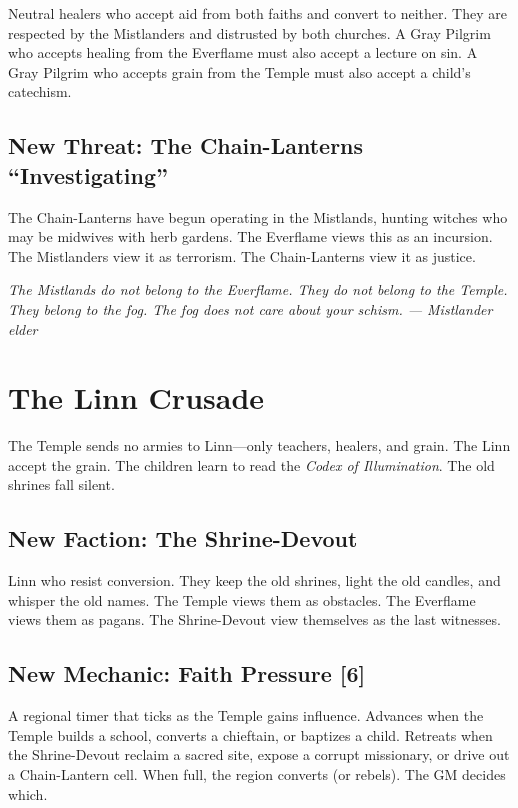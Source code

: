 \documentclass{book}
\newcommand{\citation}[1]{\textcolor{marginalia}{\small\textit{#1}}}
\begin{document}
Neutral healers who accept aid from both faiths and convert to neither. They are respected by the Mistlanders and distrusted by both churches. A Gray Pilgrim who accepts healing from the Everflame must also accept a lecture on sin. A Gray Pilgrim who accepts grain from the Temple must also accept a child's catechism.

\section{New Threat: The Chain-Lanterns ``Investigating''}

The Chain-Lanterns have begun operating in the Mistlands, hunting witches who may be midwives with herb gardens. The Everflame views this as an incursion. The Mistlanders view it as terrorism. The Chain-Lanterns view it as justice.

\citation{The Mistlands do not belong to the Everflame. They do not belong to the Temple. They belong to the fog. The fog does not care about your schism. --- Mistlander elder}

\chapter{The Linn Crusade}

The Temple sends no armies to Linn---only teachers, healers, and grain. The Linn accept the grain. The children learn to read the \textit{Codex of Illumination}. The old shrines fall silent.

\section{New Faction: The Shrine-Devout}

Linn who resist conversion. They keep the old shrines, light the old candles, and whisper the old names. The Temple views them as obstacles. The Everflame views them as pagans. The Shrine-Devout view themselves as the last witnesses.

\section{New Mechanic: Faith Pressure [6]}

A regional timer that ticks as the Temple gains influence. Advances when the Temple builds a school, converts a chieftain, or baptizes a child. Retreats when the Shrine-Devout reclaim a sacred site, expose a corrupt missionary, or drive out a Chain-Lantern cell. When full, the region converts (or rebels). The GM decides which.
\end{document}
